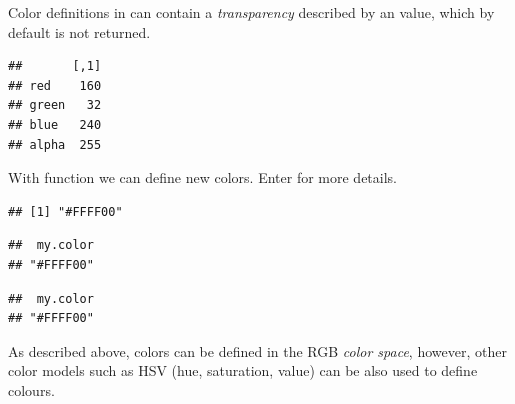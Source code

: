 \documentclass[krantz2]{krantz}\usepackage{knitr}
\begin{document}
Color definitions in \Rlang can contain a \emph{transparency} described by an  value, which by default is not returned.

\begin{knitrout}\footnotesize
{}\color{fgcolor}\begin{kframe}
\begin{alltt}
\hlstd{(}\hlstd{,}  \hlstd{=} \hlstd{)}
\end{alltt}
\begin{verbatim}
##       [,1]
## red    160
## green   32
## blue   240
## alpha  255
\end{verbatim}
\end{kframe}
\end{knitrout}

With function  we can define new colors. Enter  for more details.

\begin{knitrout}\footnotesize
{}\color{fgcolor}\begin{kframe}
\begin{alltt}
\hlstd{(}\hlstd{,} \hlstd{,} \hlstd{)}
\end{alltt}
\begin{verbatim}
## [1] "#FFFF00"
\end{verbatim}
\begin{alltt}
\hlstd{(}\hlstd{,} \hlstd{,} \hlstd{,}  \hlstd{=} \hlstd{)}
\end{alltt}
\begin{verbatim}
##  my.color
## "#FFFF00"
\end{verbatim}
\begin{alltt}
\hlstd{(}\hlstd{,} \hlstd{,} \hlstd{,}  \hlstd{=} \hlstd{,}  \hlstd{=} \hlstd{)}
\end{alltt}
\begin{verbatim}
##  my.color
## "#FFFF00"
\end{verbatim}
\end{kframe}
\end{knitrout}

As described above, colors can be defined in the RGB \emph{color space}, however, other color models such as HSV (hue, saturation, value) can be also used to define colours.
\end{document}
